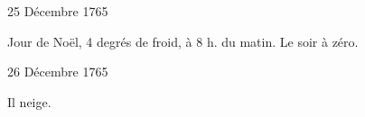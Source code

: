                      \begin{diary}{25 Décembre 1765}{}
                        
                         Jour de Noël, 4 degrés de froid, à 8 h. du matin.
                           Le
                              soir
                           à zéro. \bigskip
        
        
                     \end{diary}

                     \begin{diary}{26 Décembre 1765}{}
                        
                         Il neige. \bigskip
        
        
                     \end{diary}
                     
